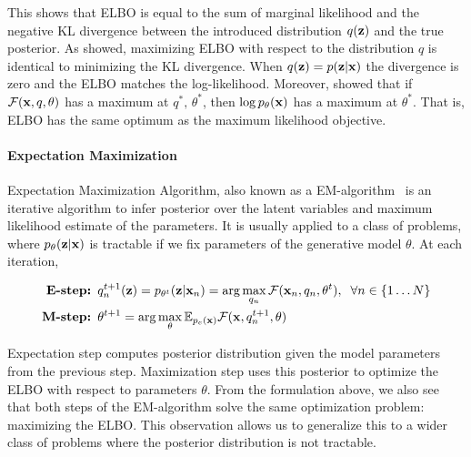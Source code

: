 This shows that ELBO is equal to the sum of marginal likelihood and the negative KL divergence between the introduced distribution $q({\mathbf{z}})$ and the true posterior.
As \citet{neal1998view} showed,  maximizing ELBO with respect to the distribution $q$ is identical to minimizing the KL divergence. When $q({\mathbf{z}}) = p({\mathbf{z}}|{\mathbf{x}})$ the divergence is zero and the ELBO matches the log-likelihood.
Moreover, \citet{neal1998view} showed that if $\mathcal{F}({\mathbf{x}}, q, \theta) $ has a maximum at $q^*, \, \theta^*$, then $\log p_{\theta}({\mathbf{x}})$ has a maximum at $\theta^*$. That is, ELBO has the same optimum as the maximum likelihood objective. 

\paragraph{Expectation Maximization}
Expectation Maximization Algorithm, also known as a EM-algorithm~\citep{dempster1977maximum} is an iterative algorithm to infer posterior over the latent variables and maximum likelihood estimate of the parameters.
It is usually applied to a class of problems, where $p_{\theta}({\mathbf{z}}|{\mathbf{x}})$ is tractable if we fix parameters of the generative model $\theta$. At each iteration, 

\begin{equation}
\begin{aligned}
    \text{\textbf{E-step:  }} &q^{t+1}_n({\mathbf{z}}) = p_{\theta^t}({\mathbf{z}}|{\mathbf{x}}_n) = \arg\max_{q_n} \mathcal{F}({\mathbf{x}}_n, q_n, \theta^t),\;\;\forall n \in \{1\dots N\}\\
    \text{\textbf{M-step:  }} &\theta^{t+1} = \arg\max_{\theta} \mathbb{E}_{p_e({\mathbf{x}})}\mathcal{F}({\mathbf{x}}, q^{t+1}_n, \theta)\\
\end{aligned}
\end{equation}

Expectation step computes posterior distribution given the model parameters from the previous step. Maximization step uses this posterior to optimize the ELBO with respect to parameters $\theta$. From the formulation above, we also see that both steps of the EM-algorithm solve the same optimization problem: maximizing the ELBO.  This observation allows us to generalize this to a wider class of problems where the posterior distribution is not tractable. 

